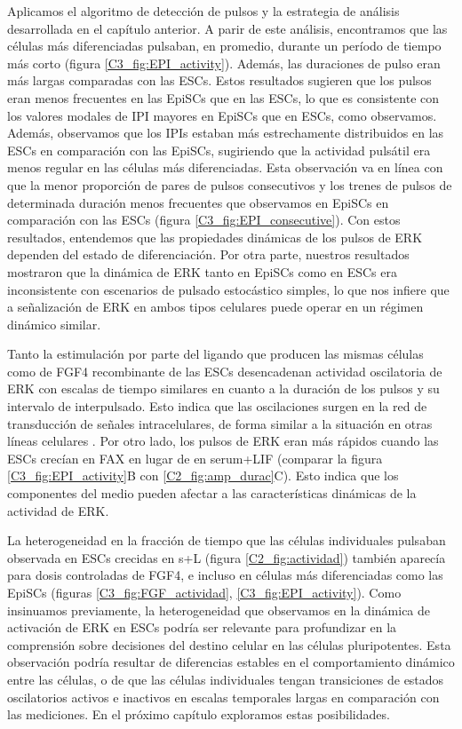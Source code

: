 \documentclass[./main.tex]{subfiles}
\begin{document}
Aplicamos el algoritmo de detección de pulsos y la estrategia de análisis desarrollada en el capítulo anterior. A parir de este análisis, encontramos que las células más diferenciadas pulsaban, en promedio, durante un período de tiempo más corto (figura \ref{C3_fig:EPI_activity}). Además, las duraciones de pulso eran más largas comparadas con las ESCs. Estos resultados sugieren que los pulsos eran menos frecuentes en las EpiSCs que en las ESCs, lo que es consistente con los valores modales de IPI mayores en EpiSCs que en ESCs, como observamos. Además, observamos que los IPIs estaban más estrechamente distribuidos en las ESCs en comparación con las EpiSCs, sugiriendo que la actividad pulsátil era menos regular en las células más diferenciadas. Esta observación va en línea con que la menor proporción de pares de pulsos consecutivos y los trenes de pulsos de determinada duración menos frecuentes que observamos en EpiSCs en comparación con las ESCs (figura \ref{C3_fig:EPI_consecutive}). Con estos resultados, entendemos que las propiedades dinámicas de los pulsos de ERK dependen del estado de diferenciación. Por otra parte, nuestros resultados mostraron que la dinámica de ERK tanto en EpiSCs como en ESCs era inconsistente con escenarios de pulsado estocástico simples, lo que nos infiere que a señalización de ERK en ambos tipos celulares puede operar en un régimen dinámico similar. 

Tanto la estimulación por parte del ligando que producen las mismas células como de FGF4 recombinante de las ESCs desencadenan actividad oscilatoria de ERK con escalas de tiempo similares en cuanto a la duración de los pulsos y su intervalo de interpulsado. Esto indica que las oscilaciones surgen en la red de transducción de señales intracelulares, de forma similar a la situación en otras líneas celulares \cite{Sparta2015}. Por otro lado, los pulsos de ERK eran más rápidos cuando las ESCs crecían en FAX en lugar de en serum+LIF (comparar la figura \ref{C3_fig:EPI_activity}B con \ref{C2_fig:amp_durac}C). Esto indica que los componentes del medio pueden afectar a las características dinámicas de la actividad de ERK. 

La heterogeneidad en la fracción de tiempo que las células individuales pulsaban observada en ESCs crecidas en s+L (figura \ref{C2_fig:actividad}) también aparecía para dosis controladas de FGF4, e incluso en células más diferenciadas como las EpiSCs (figuras \ref{C3_fig:FGF_actividad}, \ref{C3_fig:EPI_activity}). Como insinuamos previamente, la heterogeneidad que observamos en la dinámica de activación de ERK en ESCs podría ser relevante para profundizar en la comprensión sobre decisiones del destino celular en las células pluripotentes. Esta observación podría resultar de diferencias estables en el comportamiento dinámico entre las células, o de que las células individuales tengan transiciones de estados oscilatorios activos e inactivos en escalas temporales largas en comparación con las mediciones. En el próximo capítulo exploramos estas posibilidades. 
\end{document}
